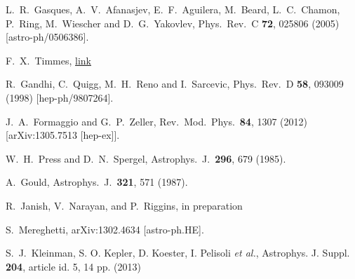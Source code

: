   L.~R.~Gasques, A.~V.~Afanasjev, E.~F.~Aguilera, M.~Beard, L.~C.~Chamon, P.~Ring, M.~Wiescher and D.~G.~Yakovlev,
  Phys.\ Rev.\ C {\bf 72}, 025806 (2005)
  [astro-ph/0506386].


F.~X.~Timmes, \href{http://cococubed.asu.edu/code_pages/coldwd.shtml}{link}

  R.~Gandhi, C.~Quigg, M.~H.~Reno and I.~Sarcevic,
  Phys.\ Rev.\ D {\bf 58}, 093009 (1998)
  [hep-ph/9807264].


  J.~A.~Formaggio and G.~P.~Zeller,
  Rev.\ Mod.\ Phys.\  {\bf 84}, 1307 (2012)
  [arXiv:1305.7513 [hep-ex]].


  W.~H.~Press and D.~N.~Spergel,
  Astrophys.\ J.\  {\bf 296}, 679 (1985).


  A.~Gould,
  Astrophys.\ J.\  {\bf 321}, 571 (1987).

R.~Janish, V.~Narayan, and P.~Riggins, in preparation

  S.~Mereghetti,
  arXiv:1302.4634 [astro-ph.HE].


S.~J.~Kleinman, S. O. Kepler, D. Koester, I. Pelisoli  {\it et al.}, Astrophys. J. Suppl. {\bf 204}, article
id. 5, 14 pp. (2013)

